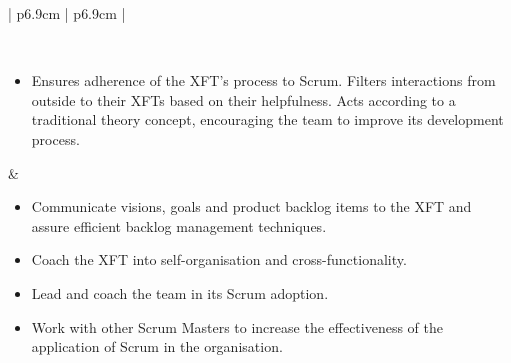 \begin{table}[!htb]
   \label{table:roledefinitions}
   \begin{tabularx}{\textwidth}{ | p{6.9cm} | p{6.9cm} | }
   
   \hline 
   
   
   \\ \hline 
   
   \begin{itemize}[label={}, leftmargin=*, topsep=0pt, itemsep=0pt, partopsep=0pt]
     \item Ensures adherence of the \ac{XFT}'s process to Scrum. Filters interactions from outside to their \acp{XFT} based on their helpfulness. Acts according to a traditional theory concept, encouraging the team to improve its development process.
   \end{itemize} & 
   
   \begin{itemize}[label={}, leftmargin=*, topsep=0pt, itemsep=0pt, partopsep=0pt]
     \item Communicate visions, goals and product backlog items to the \ac{XFT} and assure efficient backlog management techniques.
     \item Coach the \ac{XFT} into self-organisation and cross-functionality.
     \item Lead and coach the team in its Scrum adoption.
     \item Work with other Scrum Masters to increase the effectiveness of the application of Scrum in the organisation.
   \end{itemize} 
   
   \\ \hline

  \end{tabularx}
  \caption{Role descriptions}
\end{table}
